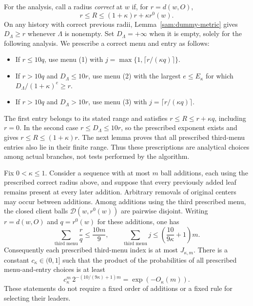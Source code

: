 For the analysis, call a radius \emph{correct} at $w$ if, for
$r=d(w,O)$,
\begin{equation}
 r\le R\le(1+\kappa)r+\kappa r^0(w).
 \label{sam:upward-radius}
\end{equation}
On any history with correct previous radii, Lemma~\ref{sam:dummy-metric}
gives $D_\Lambda\ge r$ whenever $\Lambda$ is nonempty.  Set
$D_\Lambda=+\infty$ when it is empty, solely for the following analysis.
We prescribe a correct menu and entry as follows:
\begin{itemize}
\item If $r\le10q$, use menu \textup{(1)} with
      $j=\max\{1,\lceil r/(\kappa q)\rceil\}$.
\item If $r>10q$ and $D_\Lambda\le10r$, use menu \textup{(2)} with the
      largest $e\le E_\kappa$ for which
      $D_\Lambda/(1+\kappa)^e\ge r$.
\item If $r>10q$ and $D_\Lambda>10r$, use menu \textup{(3)} with
      $j=\lceil r/(\kappa q)\rceil$.
\end{itemize}
The first entry belongs to its stated range and satisfies
$r\le R\le r+\kappa q$, including $r=0$.  In the second case
$r\le D_\Lambda\le10r$, so the prescribed exponent exists and gives
$r\le R\le(1+\kappa)r$.  The next lemma proves that all prescribed
third-menu entries also lie in their finite range.  Thus these prescriptions
are analytical choices among actual branches, not tests performed by the
algorithm.

\begin{lemma}\label{sam:radius-budget}
Fix $0<\kappa\le1$.  Consider a sequence with at most $m$ ball additions,
each using the prescribed correct radius above, and suppose that every
previously added leaf remains present at every later addition.  Arbitrary
removals of original centers may occur between additions.  Among additions
using the third prescribed menu, the closed client balls
$\mathcal D(w,r^0(w))$ are pairwise disjoint.  Writing $r=d(w,O)$ and
$q=r^0(w)$ for these additions, one has
\begin{equation}
 \sum_{\text{third menu}}\frac rq\le\frac{10m}{9},
 \qquad
 \sum_{\text{third menu}}j
 \le\left(\frac{10}{9\kappa}+1\right)m.
 \label{sam:third-menu-budget}
\end{equation}
Consequently each prescribed third-menu index is at most
$J_{\kappa,m}$.  There is a constant $c_\kappa\in(0,1]$ such that the
product of the probabilities of all prescribed menu-and-entry choices is
at least
\begin{equation}
 c_\kappa^m\,
 2^{-(10/(9\kappa)+1)m}=\exp(-O_\kappa(m)).
 \label{sam:menu-probability}
\end{equation}
These statements do not require a fixed order of additions or a fixed
rule for selecting their leaders.
\end{lemma}

